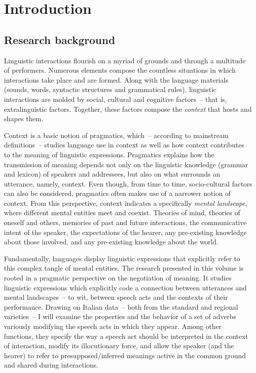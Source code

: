 \chapter{Introduction}\label{sec:1}
\hypertarget{Toc124860606}{}\section{Research background}
\hypertarget{Toc124860607}{}
Linguistic interactions flourish on a myriad of grounds and through a multitude of performers. Numerous elements compose the countless situations in which interactions take place and are formed. Along with the language materials (sounds, words, syntactic structures and grammatical rules), linguistic interactions are molded by social, cultural and cognitive factors~– that is, extralinguistic factors. Together, these factors compose the \textit{context} that hosts and shapes them.

Context is a basic notion of pragmatics, which~– according to mainstream definitions~– studies language use in context as well as how context contributes to the meaning of linguistic expressions. Pragmatics explains how the transmission of meaning depends not only on the linguistic knowledge (grammar and lexicon) of speakers and addressees, but also on what surrounds an utterance, namely, context. Even though, from time to time, socio-cultural factors can also be considered, pragmatics often makes use of a narrower notion of context. From this perspective, context indicates a specifically \textit{mental landscape}, where different mental entities meet and coexist. Theories of mind, theories of oneself and others, memories of past and future interactions, the communicative intent of the speaker, the expectations of the hearer, any pre-existing knowledge about those involved, and any pre-existing knowledge about the world.

Fundamentally, languages display linguistic expressions that explicitly refer to this complex tangle of mental entities. The research presented in this volume is rooted in a pragmatic perspective on the negotiation of meaning. It studies linguistic expressions which explicitly code a connection between utterances and mental landscapes~– to wit, between speech acts and the contexts of their performance. Drawing on Italian data~– both from the standard and regional varieties~– I will examine the properties and the behavior of a set of adverbs variously modifying the speech acts in which they appear. Among other functions, they specify the way a speech act should be interpreted in the context of interaction, modify its illocutionary force, and allow the speaker (and the hearer) to refer to presupposed/inferred meanings active in the common ground and shared during interactions.

